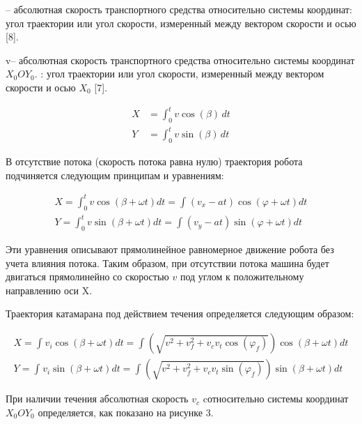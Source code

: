 -- абсолютная скорость транспортного средства относительно системы
координат: угол траектории или угол скорости, измеренный между вектором
скорости и осью {[}8{]}.

v-- абсолютная скорость транспортного средства относительно системы
координат \(X_{0}OY_{0}\). : угол траектории или угол скорости,
измеренный между вектором скорости и осью \(X_{0}\) {[}7{]}.

\begin{equation}
  \begin{aligned}
  X &= \int_{0}^{t} v \cos(\beta) \, dt \\
  Y &= \int_{0}^{t} v \sin(\beta) \, dt
  \end{aligned}
  \end{equation}
  

В отсутствие потока (скорость потока равна нулю) траектория робота
подчиняется следующим принципам и уравнениям:

\begin{equation}
  \begin{aligned}
    X = \int_{0}^{t}v\cos(\beta + \omega t)dt = \int_{}^{}\left( v_{x} - at \right)\cos(\varphi + \omega t)dt \\
    Y = \int_{0}^{t}v\sin(\beta + \omega t)dt = \int_{}^{}\left( v_{y} - at \right)\sin(\varphi + \omega t)dt
  \end{aligned}
\end{equation}


Эти уравнения описывают прямолинейное равномерное движение робота без
учета влияния потока. Таким образом, при отсутствии потока машина будет
двигаться прямолинейно со скоростью \(v\) под углом к положительному
направлению оси X.

Траектория катамарана под действием течения определяется следующим
образом:

\begin{equation}
  \begin{aligned}
    X = \int_{}^{}v_{i}\cos(\beta + \omega t)dt = \int_{}^{}\left( \sqrt{v^{2} + v_{f}^{2} + v_{c}v_{t}\cos\left( \varphi_{f} \right)} \right)\cos(\beta + \omega t)dt \\
    Y = \int_{}^{}v_{i}\sin(\beta + \omega t)dt = \int_{}^{}\left( \sqrt{v^{2} + v_{f}^{2} + v_{c}v_{t}\sin\left( \varphi_{f} \right)} \right)\sin(\beta + \omega t)dt
  \end{aligned}
\end{equation}



При наличии течения абсолютная скорость \(v_{c}\) cотносительно системы
координат  \(X_{0}OY_{0}\) определяется, как показано на рисунке 3.

